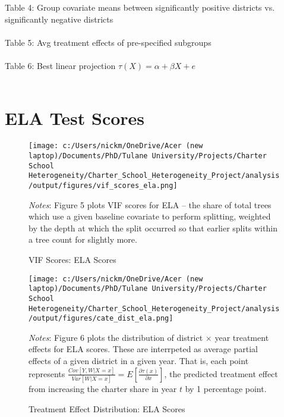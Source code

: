 \documentclass{article} %
\begin{document}
Table 4: Group covariate means between significantly positive districts vs. significantly negative districts\\
\\


Table 5: Avg treatment effects of pre-specified subgroups \\
\\

Table 6: Best linear projection $\tau(X) = \alpha + \beta X + e$\\
\\


	\section{ELA Test Scores}

\begin{figure}[H]
\centering
\texttt{[image: c:/Users/nickm/OneDrive/Acer (new laptop)/Documents/PhD/Tulane University/Projects/Charter School Heterogeneity/Charter\_School\_Heterogeneity\_Project/analysis/output/figures/vif\_scores\_ela.png]}
\caption{VIF Scores: ELA Scores}
\label{fig:image5}
\begin{minipage}{1\linewidth}
\singlespacing
\footnotesize
\emph{Notes}: Figure 5 plots VIF scores for ELA -- the share of total trees which use a given baseline covariate to perform splitting, weighted by the depth at which the split occurred so that earlier splits within a tree count for slightly more.  
\end{minipage}
\end{figure}


\begin{figure}[H]
\centering
\texttt{[image: c:/Users/nickm/OneDrive/Acer (new laptop)/Documents/PhD/Tulane University/Projects/Charter School Heterogeneity/Charter\_School\_Heterogeneity\_Project/analysis/output/figures/cate\_dist\_ela.png]}
\caption{Treatment Effect Distribution: ELA Scores}
\label{fig:image6}
\begin{minipage}{1\linewidth}
\singlespacing
\footnotesize
\emph{Notes}: Figure 6 plots the distribution of district $\times$ year treatment effects for ELA scores. These are interrpeted as average partial effects of a given district in a given year. That is, each point represents $\frac{Cov[Y, W | X = x]}{Var[W | X = x]} = E\left[ \frac{\partial \tau(x)}{\partial x} \right]$, the predicted treatment effect from increasing the charter share in year $t$ by 1 percentage point.
\end{minipage}
\end{figure}
\end{document}

